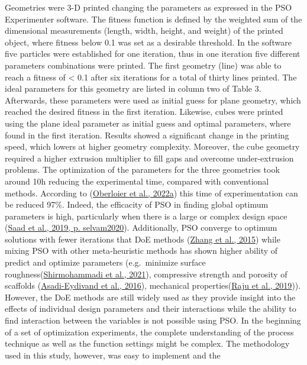 \documentclass[
  12pt,
  number,
  review]{elsarticle}
\begin{document}
Geometries were 3-D printed changing the parameters as expressed in the
PSO Experimenter software. The fitness function is defined by the
weighted sum of the dimensional measurements (length, width, height, and
weight) of the printed object, where fitness below 0.1 was set as a
desirable threshold. In the software five particles were established for
one iteration, thus in one iteration five different parameters
combinations were printed. The first geometry (line) was able to reach a
fitness of \textless{} 0.1 after six iterations for a total of thirty
lines printed. The ideal parameters for this geometry are listed in
column two of Table 3. Afterwards, these parameters were used as initial
guess for plane geometry, which reached the desired fitness in the first
iteration. Likewise, cubes were printed using the plane ideal parameter
as initial guess and optimal parameters, where found in the first
iteration. Results showed a significant change in the printing speed,
which lowers at higher geometry complexity. Moreover, the cube geometry
required a higher extrusion multiplier to fill gaps and overcome
under-extrusion problems. The optimization of the parameters for the
three geometries took around 10h reducing the experimental time,
compared with conventional methods. According to
(\protect\hyperlink{ref-oberloier2022}{Oberloier et al., 2022a}) this
time of experimentation can be reduced 97\%. Indeed, the efficacity of
PSO in finding global optimum parameters is high, particularly when
there is a large or complex design space
(\protect\hyperlink{ref-saad2019a}{Saad et al., 2019, p. selvam2020}).
Additionally, PSO converge to optimum solutions with fewer iterations
that DoE methods (\protect\hyperlink{ref-zhang2015}{Zhang et al., 2015})
while mixing PSO with other meta-heuristic methods has shown higher
ability of predict and optimize parameters (e.g.~minimize surface
roughness(\protect\hyperlink{ref-shirmohammadi2021}{Shirmohammadi et
al., 2021}), compressive strength and porosity of scaffolds
(\protect\hyperlink{ref-asadi-eydivand2016}{Asadi-Eydivand et al.,
2016}), mechanical properties(\protect\hyperlink{ref-raju2019}{Raju et
al., 2019})). However, the DoE methods are still widely used as they
provide insight into the effects of individual design parameters and
their interactions while the ability to find interaction between the
variables is not possible using PSO. In the beginning of a set of
optimization experiments, the complete understanding of the process
technique as well as the function settings might be complex. The
methodology used in this study, however, was easy to implement and the
\end{document}
